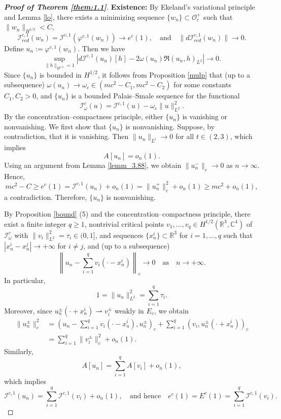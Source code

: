 \documentclass{amsart}
\theoremstyle{plain}
\theoremstyle{definition}
\theoremstyle{remark}
\numberwithin{equation}{section} \numberwithin{figure}{section}
\begin{document}
 \begin{proof}[\textbf{Proof of Theorem \ref{them:1.1}}] 
  \textbf{Existence:}  
  By Ekeland’s variational principle and Lemma \ref{lo}, there exists a minimizing sequence $\{w_n\} \subset \mathcal{O}_c^+$ such that $\|w_n\|_{H^{1/2}} < C$,  
  \[
  \mathcal{I}_{red}^{c,1}(w_n) = \mathcal{I}^{c,1}(\varphi^{c,1}(w_n)) \to e^c(1), \quad \text{and} \quad \|d\mathcal{I}_{red}^{c,1}(w_n)\| \to 0.
  \]  
  Define $u_n := \varphi^{c,1}(w_n)$. Then we have  
  \[
  \sup_{\|h\|_{H^{1/2}} = 1} \left| d\mathcal{I}^{c,1}(u_n)[h] - 2\omega(u_n) \Re(u_n, h)_{L^2} \right| \to 0.
  \]  
  Since $\{u_n\}$ is bounded in $H^{1/2}$, it follows from Proposition \ref{mulp} that (up to a subsequence) $\omega(u_n) \to \omega_c \in (mc^2 - C_1, mc^2 - C_2)$ for some constants $C_1, C_2 > 0$, and $\{u_n\}$ is a bounded Palais–Smale sequence for the functional  
  \[
  \mathcal{I}_\omega^c(u) = \mathcal{I}^{c,1}(u) - \omega_c \|u\|_{L^2}^2.
  \]  
  By the concentration–compactness principle, either $\{u_n\}$ is vanishing or nonvanishing. We first show that $\{u_n\}$ is nonvanishing. Suppose, by contradiction, that it is vanishing. Then $\|u_n\|_{L^t} \to 0$ for all $t \in (2, 3)$, which implies  
  \[
  A[u_n] = o_n(1).
  \]  
  Using an argument from Lemma \ref{lemm_3.88}, we obtain $\|u_n^-\|_c \to 0$ as $n \to \infty$. Hence,  
  \[
  mc^2 - C \geq e^c(1) = \mathcal{I}^{c,1}(u_n) + o_n(1) = \|u_n^+\|_c^2 + o_n(1) \geq mc^2 + o_n(1),
  \]  
  a contradiction. Therefore, $\{u_n\}$ is nonvanishing.  
  
  By Proposition \ref{bound} (5) and the concentration–compactness principle, there exist a finite integer $q \geq 1$, nontrivial critical points $v_1, \dots, v_q \in H^{1/2}(\mathbb{R}^3, \mathbb{C}^4)$ of $\mathcal{I}_\omega^c$ with $\|v_i\|_{L^2}^2 = \tau_i \in (0, 1]$, and sequences $\{x_n^i\} \subset \mathbb{R}^3$ for $i = 1, \dots, q$ such that $|x_n^i - x_n^j| \to +\infty$ for $i \ne j$, and (up to a subsequence)  
  \[
  \left\| u_n - \sum_{i=1}^q v_i(\cdot - x_n^i) \right\|_c \to 0 \quad \text{as} \quad n \to +\infty.
  \]  
  In particular,  
  \[
  1 = \|u_n\|_{L^2}^2 = \sum_{i=1}^q \tau_i.
  \]  
  Moreover, since $u_n^\pm(\cdot + x_n^i) \rightharpoonup v_i^\pm$ weakly in $E_c$, we obtain  
  \[
  \begin{aligned}
  \|u_n^\pm\|_c^2 &= \left( u_n - \sum_{i=1}^q v_i(\cdot - x_n^i), u_n^\pm \right)_c + \sum_{i=1}^q \left( v_i, u_n^\pm(\cdot + x_n^i) \right)_c \\
  &= \sum_{i=1}^q \|v_i^\pm\|_c^2 + o_n(1).
  \end{aligned}
  \]  
  Similarly,  
  \[
  A[u_n] = \sum_{i=1}^q A[v_i] + o_n(1),
  \]  
  which implies  
  \[
  \mathcal{I}^{c,1}(u_n) = \sum_{i=1}^q \mathcal{I}^{c,1}(v_i) + o_n(1), \quad \text{and hence} \quad e^c (1)= E^c(1) = \sum_{i=1}^q \mathcal{I}^{c,1}(v_i).
  \]  
  

\end{proof}
\end{document}
